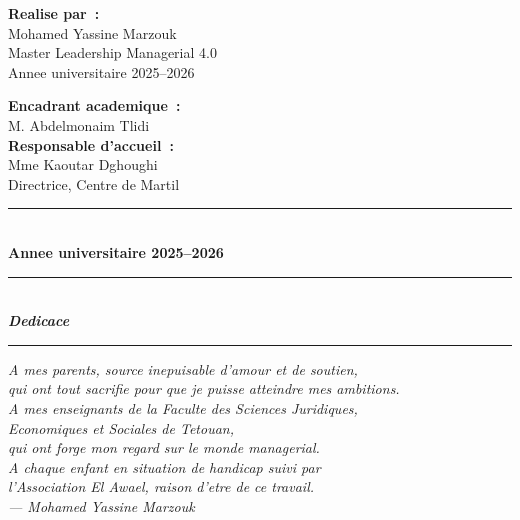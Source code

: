 \documentclass[12pt,a4paper,openany]{report}
\begin{document}
\begin{titlepage}
\begin{center}
  \vspace{1cm}
  \begin{minipage}[t]{0.47\textwidth}
    \raggedright
    {\bfseries Realise par~:}\\[0.1cm]
    Mohamed Yassine Marzouk\\
    Master Leadership Managerial 4.0\\
    Annee universitaire 2025--2026
  \end{minipage}
  \hfill
  \begin{minipage}[t]{0.47\textwidth}
    \raggedleft
    {\bfseries Encadrant academique~:}\\[0.1cm]
    M. Abdelmonaim Tlidi\\[0.3cm]
    {\bfseries Responsable d'accueil~:}\\[0.1cm]
    Mme Kaoutar Dghoughi\\
    {\small Directrice, Centre de Martil}
  \end{minipage}

  \vfill
  \textcolor{bleu}{\rule{\textwidth}{1pt}}\\[0.2cm]
  {\large\bfseries Annee universitaire 2025--2026}
\end{center}
\end{titlepage}

\cleardoublepage
\thispagestyle{empty}
\vspace*{5cm}
\begin{center}
  \textcolor{bleu}{\rule{0.4\textwidth}{0.5pt}}\\[0.5cm]
  {\large\itshape\bfseries Dedicace}\\[0.5cm]
  \textcolor{bleu}{\rule{0.4\textwidth}{0.5pt}}
\end{center}
\vspace{1cm}
\begin{flushright}
\begin{minipage}{0.7\textwidth}
\itshape
A mes parents, source inepuisable d'amour et de soutien,\\
qui ont tout sacrifie pour que je puisse atteindre mes ambitions.\\[0.4cm]
A mes enseignants de la Faculte des Sciences Juridiques,\\
Economiques et Sociales de Tetouan,\\
qui ont forge mon regard sur le monde managerial.\\[0.4cm]
A chaque enfant en situation de handicap suivi par\\
l'Association El Awael, raison d'etre de ce travail.\\[0.5cm]
\raggedleft --- Mohamed Yassine Marzouk
\end{minipage}
\end{flushright}
\end{document}
